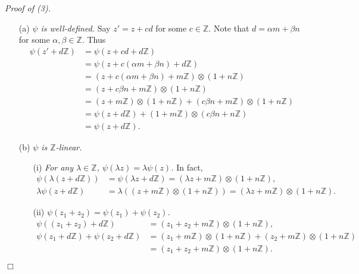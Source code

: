 \documentclass{article}
\begin{document}
\emph{Proof of (3).}
\begin{enumerate}
\item[(a)]
\emph{$\psi$ is well-defined.}
Say $z' = z + cd$ for some $c \in \mathbb{Z}$.
Note that $d = \alpha m + \beta n$ for some $\alpha, \beta \in \mathbb{Z}$.
Thus
\begin{align*}
  \psi(z' + d\mathbb{Z})
  &= \psi(z + cd + d\mathbb{Z}) \\
  &= \psi(z + c(\alpha m + \beta n) + d\mathbb{Z}) \\
  &= (z + c(\alpha m + \beta n) + m\mathbb{Z}) \otimes (1 + n\mathbb{Z}) \\
  &= (z + c \beta n + m\mathbb{Z}) \otimes (1 + n\mathbb{Z}) \\
  &= (z + m\mathbb{Z}) \otimes (1 + n\mathbb{Z})
  + (c \beta n + m\mathbb{Z}) \otimes (1 + n\mathbb{Z}) \\
  &= \psi(z + d\mathbb{Z})
  + (1 + m\mathbb{Z}) \otimes (c \beta n + n\mathbb{Z}) \\
  &= \psi(z + d\mathbb{Z}).
\end{align*}
\item[(b)]
\emph{$\psi$ is $\mathbb{Z}$-linear.}
\begin{enumerate}
\item[(i)]
\emph{For any $\lambda \in \mathbb{Z}$,
$\psi(\lambda z) = \lambda \psi(z)$.}
In fact,
\begin{align*}
  \psi(\lambda(z + d\mathbb{Z}))
  &= \psi(\lambda z + d\mathbb{Z})
  = (\lambda z + m\mathbb{Z}) \otimes (1 + n\mathbb{Z}), \\
  \lambda \psi(z + d\mathbb{Z})
  &= \lambda((z + m\mathbb{Z}) \otimes (1 + n\mathbb{Z}))
  = (\lambda z + m\mathbb{Z}) \otimes (1 + n\mathbb{Z}).
\end{align*}
\item[(ii)]
\emph{$\psi(z_1 + z_2) = \psi(z_1) + \psi(z_2)$.}
\begin{align*}
  \psi((z_1 + z_2) + d\mathbb{Z})
  &= (z_1 + z_2 + m\mathbb{Z}) \otimes (1 + n\mathbb{Z}), \\
  \psi(z_1 + d\mathbb{Z}) + \psi(z_2 + d\mathbb{Z})
  &= (z_1 + m\mathbb{Z}) \otimes (1 + n\mathbb{Z})
  + (z_2 + m\mathbb{Z}) \otimes (1 + n\mathbb{Z}) \\
  &= (z_1 + z_2 + m\mathbb{Z}) \otimes (1 + n\mathbb{Z}).
\end{align*}
\end{enumerate}
\end{enumerate}
$\Box$ \\
\end{document}
